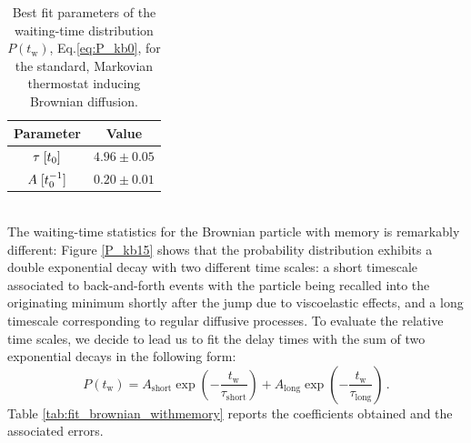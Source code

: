 \begin{table}[ht]
\centering 
\begin{tabular}{cc}
    \toprule
    Parameter & Value  \\
    \midrule 
    $\tau \hspace{0.1cm} [t_0]$ & $4.96\pm 0.05$ \\[0.5ex]
    $A \hspace{0.1cm} [t_0^{-1}]$ & $0.20\pm 0.01$ \\
    \bottomrule
\end{tabular}
\caption{Best fit parameters of the waiting-time distribution $P(t_\text{w})$, Eq.\eqref{eq:P_kb0}, for the standard, Markovian thermostat inducing Brownian diffusion.}
\label{tab:fit_brownian_diffusion}
\end{table}
\\
\noindent The waiting-time statistics for the Brownian particle with memory is remarkably different: Figure \ref{P_kb15} shows that the probability distribution exhibits a double exponential decay with two different time scales: a short timescale associated to back-and-forth events with the particle being recalled into the originating minimum shortly after the jump due to viscoelastic effects, and a long timescale corresponding to regular diffusive processes. To evaluate the relative time scales, we decide to lead us to fit the delay times with the sum of two exponential decays in the following form:
\begin{equation}
    P(t_\text{w}) = A_\text{short} \exp{\left(- \dfrac{t_\text{w}}{\tau_\text{short}}\right)} + A_\text{long} \exp{\left(- \dfrac{t_\text{w}}{\tau_\text{long}}\right)}\,.
\end{equation}
Table \ref{tab:fit_brownian_withmemory} reports the coefficients obtained and the associated errors.
